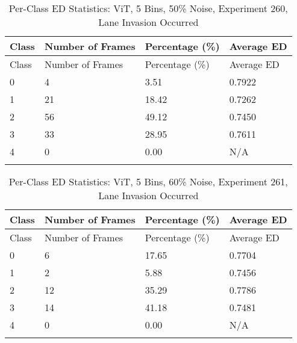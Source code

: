 
\begin{longtable}{@{}llll@{}}
\toprule
Class & Number of Frames & Percentage (\%) & Average ED \\
\midrule
\endfirsthead
\toprule
Class & Number of Frames & Percentage (\%) & Average ED \\
\midrule
\endhead
0 & 4 & 3.51 & 0.7922 \\
1 & 21 & 18.42 & 0.7262 \\
2 & 56 & 49.12 & 0.7450 \\
3 & 33 & 28.95 & 0.7611 \\
4 & 0 & 0.00 & N/A \\
\bottomrule
\caption{Per-Class ED Statistics: ViT, 5 Bins, 50\% Noise, Experiment 260, Lane Invasion Occurred}
\label{tab:exp260_ViT_5bins_50noise}
\end{longtable}
        


\begin{longtable}{@{}llll@{}}
\toprule
Class & Number of Frames & Percentage (\%) & Average ED \\
\midrule
\endfirsthead
\toprule
Class & Number of Frames & Percentage (\%) & Average ED \\
\midrule
\endhead
0 & 6 & 17.65 & 0.7704 \\
1 & 2 & 5.88 & 0.7456 \\
2 & 12 & 35.29 & 0.7786 \\
3 & 14 & 41.18 & 0.7481 \\
4 & 0 & 0.00 & N/A \\
\bottomrule
\caption{Per-Class ED Statistics: ViT, 5 Bins, 60\% Noise, Experiment 261, Lane Invasion Occurred}
\label{tab:exp261_ViT_5bins_60noise}
\end{longtable}
        